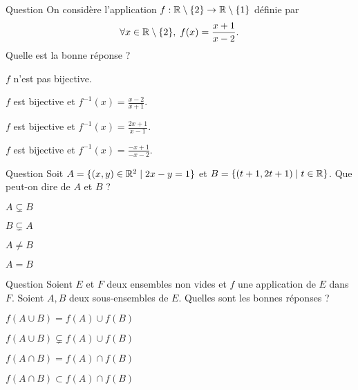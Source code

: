 \begin{multi}[multiple,feedback=
{Tout \(y\neq 1\) admet un unique antécédent qui s'écrit \(\displaystyle x=\frac{2y+1}{y-1}\in \Rr\setminus\{2\}\). Donc \(f\) est bijective et \(\displaystyle f^{-1}(y)=\frac{2y+1}{y-1}\).
}]{Question}
On considère l'application \(f:\mathbb{R}\setminus\{2\}\to \mathbb{R}\setminus \{1\}\) définie par
\[\forall x\in \mathbb{R}\setminus\{2\},\; f(x)=\frac{x+1}{x-2}.\]
Quelle est la bonne réponse ?

    \item \(f\) n'est pas bijective.
    \item \(f\) est bijective et \(\displaystyle f^{-1}(x)=\frac{x-2}{x+1}\).
    \item* \(f\) est bijective et \(\displaystyle f^{-1}(x)=\frac{2x+1}{x-1}\).
    \item \(f\) est bijective et \(\displaystyle f^{-1}(x)=\frac{-x+1}{-x-2}\).
\end{multi}


\begin{multi}[multiple,feedback=
{D'abord, \(2(t+1)-(2t+1)=1\). Donc \(B\subset A\). Réciproquement, pour tout \((x,y)\in A\), il existe \(t\in \Rr\) tel que \(x=t+1\) et donc \(y=2t+1\). D'où \((x,y)\in B\).
}]{Question}
Soit \(A=\{(x,y)\in \mathbb{R}^2\mid 2x-y=1\}\) et \(B=\{(t+1,2t+1)\mid t\in \mathbb{R}\}\). Que peut-on dire de \(A\) et \(B\) ?

    \item \(A\varsubsetneq B\)
    \item \(B\varsubsetneq A\)
    \item \(A\neq B\)
    \item* \(A=B\)
\end{multi}


\begin{multi}[multiple,feedback=
{On a : \(y\in f(A\cup B)\Leftrightarrow \exists x\in A\cup B,\; y=f(x)\Leftrightarrow (\exists x\in A,\; y=f(x))\mbox{ ou }(\exists x\in B,\; y=f(x))\Leftrightarrow (y\in f(A)\mbox{ ou }y\in f(B))\). Par ailleurs, si \(y\in f(A\cap B)\), il existe \(x\in A\cap B\) tel que \(y=f(x)\). Donc \(y\in f(A)\) et \(y\in f(B)\), c'est-à-dire \(y\in f(A)\cap f(B)\).
}]{Question}
Soient \(E\) et \(F\) deux ensembles non vides et \(f\) une application de \(E\) dans \(F\). Soient \(A,B\) deux sous-ensembles de \(E\). Quelles sont les bonnes réponses ?

    \item* \(f(A\cup B)=f(A)\cup f(B)\)
    \item \(f(A\cup B)\varsubsetneq f(A)\cup f(B)\)
    \item \(f(A\cap B)=f(A)\cap f(B)\)
    \item* \(f(A\cap B)\subset f(A)\cap f(B)\)
\end{multi}


